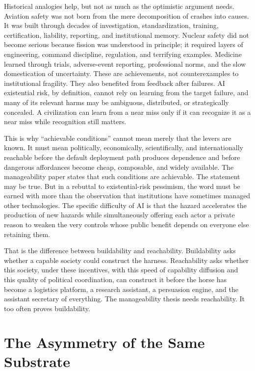 \documentclass[11pt]{article}
\begin{document}
Historical analogies help, but not as much as the optimistic argument needs. Aviation safety was not born from the mere decomposition of crashes into causes. It was built through decades of investigation, standardization, training, certification, liability, reporting, and institutional memory. Nuclear safety did not become serious because fission was understood in principle; it required layers of engineering, command discipline, regulation, and terrifying examples. Medicine learned through trials, adverse-event reporting, professional norms, and the slow domestication of uncertainty. These are achievements, not counterexamples to institutional fragility. They also benefited from feedback after failures. AI existential risk, by definition, cannot rely on learning from the target failure, and many of its relevant harms may be ambiguous, distributed, or strategically concealed. A civilization can learn from a near miss only if it can recognize it as a near miss while recognition still matters.

This is why ``achievable conditions'' cannot mean merely that the levers are known. It must mean politically, economically, scientifically, and internationally reachable before the default deployment path produces dependence and before dangerous affordances become cheap, composable, and widely available. The manageability paper states that such conditions are achievable. The statement may be true. But in a rebuttal to existential-risk pessimism, the word must be earned with more than the observation that institutions have sometimes managed other technologies. The specific difficulty of AI is that the hazard accelerates the production of new hazards while simultaneously offering each actor a private reason to weaken the very controls whose public benefit depends on everyone else retaining them.

That is the difference between buildability and reachability. Buildability asks whether a capable society could construct the harness. Reachability asks whether this society, under these incentives, with this speed of capability diffusion and this quality of political coordination, can construct it before the horse has become a logistics platform, a research assistant, a persuasion engine, and the assistant secretary of everything. The manageability thesis needs reachability. It too often proves buildability.

\section{The Asymmetry of the Same Substrate}
\label{sec:substrate}
\end{document}
